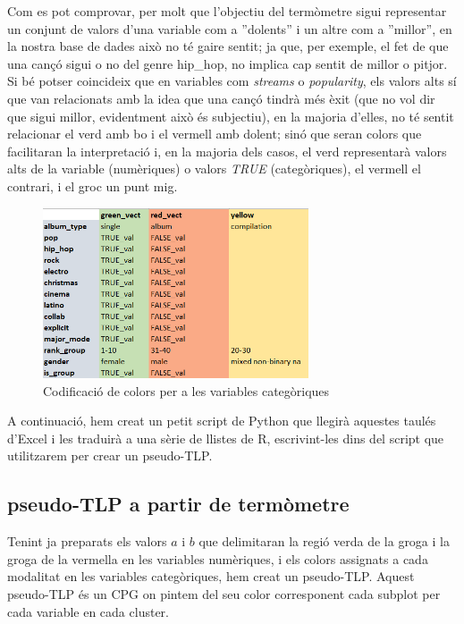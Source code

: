 Com es pot comprovar, per molt que l'objectiu del termòmetre sigui representar un conjunt de valors d'una variable com a ''dolents'' i un altre com a ''millor'', en la nostra base de dades això no té gaire sentit; ja que, per exemple, el fet de que una cançó sigui o no del genre hip\_hop, no implica cap sentit de millor o pitjor. Si bé potser coincideix que en variables com \textit{streams} o \textit{popularity}, els valors alts sí que van relacionats amb la idea que una cançó tindrà més èxit (que no vol dir que sigui millor, evidentment això és subjectiu), en la majoria d'elles, no té sentit relacionar el verd amb bo i el vermell amb dolent; sinó que seran colors que facilitaran la interpretació i, en la majoria dels casos, el verd representarà valors alts de la variable (numèriques) o valors \textit{TRUE} (categòriques), el vermell el contrari, i el groc un punt mig.

\begin{figure}[H] 
    \centering
    \includegraphics[width=0.7\textwidth]{Images/5_TLP/term_quali.png}
    \caption{Codificació de colors per a les variables categòriques}
    \label{fig:5_TLP:term_quali}
\end{figure}

A continuació, hem creat un petit script de Python que llegirà aquestes taulés d'Excel i les traduirà a una sèrie de llistes de R, escrivint-les dins del script que utilitzarem per crear un pseudo-TLP.

\subsection{pseudo-TLP a partir de termòmetre}

Tenint ja preparats els valors $a$ i $b$ que delimitaran la regió verda de la groga i la groga de la vermella en les variables numèriques, i els colors assignats a cada modalitat en les variables categòriques, hem creat un pseudo-TLP. Aquest pseudo-TLP és un CPG on pintem del seu color corresponent cada subplot per cada variable en cada cluster.

